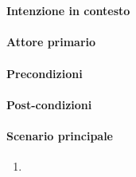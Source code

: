 \section{}\label{uc:22}
\paragraph{Intenzione in contesto}
\paragraph{Attore primario}
\paragraph{Precondizioni}
\paragraph{Post-condizioni}
\paragraph{Scenario principale}
\begin{enumerate}
    \item 
\end{enumerate}